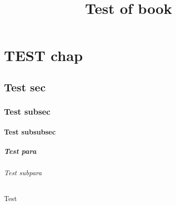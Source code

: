 \documentclass[12pt]{book}
\title{Test of book}
\begin{document}
    \tableofcontents
    
    
    
    \chapter{TEST chap}
    \section{Test sec}
    \subsection{Test subsec}
    \subsubsection{Test subsubsec}
    \paragraph{Test para}
    \subparagraph{Test subpara}
    Test
\end{document}
